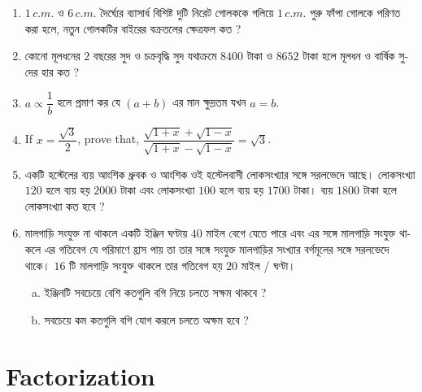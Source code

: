 \documentclass[11pt, a4paper]{article}
\begin{document}
\begin{enumerate}
	\item $1 \, c.m.$ \textbengali{ও} $6  \, c.m.$ \textbengali{দৈর্ঘ্যের ব্যাসার্ধ বিশিষ্ট দুটি নিরেট গোলককে গলিয়ে}  $1 \, c.m.$ \textbengali{পুরু ফাঁপা গোলকে পরিণত করা হলে, নতুন গোলকটির বাইরের বক্রতলের ক্ষেত্রফল কত ?}
	
	\item \textbengali{কোনো মূলধনের} $2$ \textbengali{বছরের সুদ ও চক্রবৃদ্ধি সুদ যথাক্রমে} $8400$ \textbengali{টাকা ও} $8652$ \textbengali{টাকা হলে মূলধন ও বার্ষিক সুদের হার কত ?}
	
	\item $a \propto \dfrac{1}{b}$ \textbengali{হলে প্রমাণ কর যে} $(a+b)$ \textbengali{এর মান ক্ষুদ্রতম যখন} $a = b$.
	
	\item If $x = \dfrac{\sqrt{3}}{2}$, prove that, $\dfrac{\sqrt{1+x} + \sqrt{1-x}}{\sqrt{1+x} - \sqrt{1-x}} = \sqrt{3}$.
	
	\item \textbengali{একটি হস্টেলের ব্যয় আংশিক ধ্রুবক ও আংশিক ওই হস্টেলবাসী লোকসংখ্যার সঙ্গে সরলভেদে আছে। লোকসংখ্যা} $120$ \textbengali{হলে ব্যয় হয়} $2000$ \textbengali{টাকা এবং লোকসংখ্যা} $100$ \textbengali{হলে ব্যয় হয়} $1700$ \textbengali{টাকা। ব্যয়} $1800$ \textbengali{টাকা হলে লোকসংখ্যা কত হবে ?}
	
	\item \textbengali{মালগাড়ি সংযুক্ত না থাকলে একটি ইঞ্জিন ঘণ্টায়} $40$ \textbengali{মাইল বেগে যেতে পারে এবং এর সঙ্গে মালগাড়ি সংযুক্ত থাকলে এর গতিবেগ যে পরিমাণে হ্রাস পায় তা তার সঙ্গে সংযুক্ত মালগাড়ির সংখ্যার বর্গমূলের সঙ্গে সরলভেদে থাকে।} $16$ \textbengali{টি মালগাড়ি সংযুক্ত থাকলে তার গতিবেগ হয়} $20$ \textbengali{মাইল / ঘণ্টা।}
	\begin{enumerate}[(a)]
		\item \textbengali{ইঞ্জিনটি সবচেয়ে বেশি কতগুলি বগি নিয়ে চলতে সক্ষম থাকবে ?}
		\item \textbengali{সবচেয়ে কম কতগুলি বগি যোগ করলে চলতে অক্ষম হবে ?}
	
	\end{enumerate}
\end{enumerate}





\section{Factorization}
\end{document}
